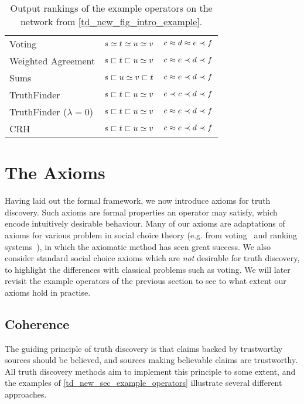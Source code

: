 \begin{table}
    \centering
	\caption{Output rankings of the example operators on the network from
    \cref{td_new_fig_intro_example}.}
	\begin{tabular}{lcc}
    \toprule
    Voting             & $s \simeq t \simeq u \simeq v$ & $c \approx d \approx e \prec f$ \\
    Weighted Agreement & $s \sqsubset t \sqsubset u \simeq v$ & $c \approx e \prec d \prec f$ \\
    Sums               & $s \sqsubset u \simeq v \sqsubset t$ & $c \approx e \prec d \prec f$ \\
    TruthFinder        & $s \sqsubset t \sqsubset u \simeq v$ & $e \prec c \prec d \prec f$ \\
    TruthFinder ($\lambda = 0$) & $s \sqsubset t \sqsubset u \simeq v$ & $c \approx e \prec d \prec f$ \\
    CRH                & $s \sqsubset t \sqsubset u \simeq v$ & $c \approx e \prec d \prec f$ \\
    \bottomrule
	\end{tabular}
    \label{td_new_tab_example_outputs}
\end{table}

\section{The Axioms}

Having laid out the formal framework, we now introduce axioms for truth
discovery. Such axioms are formal properties an operator may satisfy, which
encode intuitively desirable behaviour. Many of our axioms are adaptations of
axioms for various problem in social choice theory (e.g. from
voting~\cite{zwicker2016voting} and ranking systems~\cite{altman2008}), in
which the axiomatic method has seen great success. We also consider standard
social choice axioms which are \emph{not} desirable for truth discovery, to
highlight the differences with classical problems such as voting. We will later
revisit the example operators of the previous section to see to what extent our
axioms hold in practise.

\subsection{Coherence}

The guiding principle of truth discovery is that claims backed by trustworthy
sources should be believed, and sources making believable claims are
trustworthy. All truth discovery methods aim to implement this principle to
some extent, and the examples of \cref{td_new_sec_example_operators} illustrate
several different approaches.

